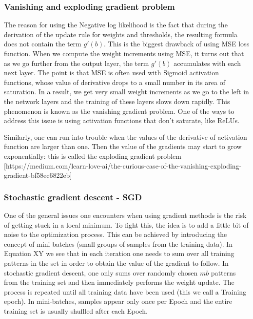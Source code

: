 \subsubsection{Vanishing and exploding gradient problem}

The reason for using the Negative log likelihood is the fact that during the derivation of the update rule for weights and thresholds, the resulting formula does not contain the term $ g'(b) $. This is the biggest drawback of using MSE loss function. When we compute the weight increments using MSE, it turns out that as we go further from the output layer, the term $ g'(b) $ accumulates with each next layer. The point is that MSE is often used with Sigmoid activation functions, whose value of derivative drops to a small number in its area of saturation. In a result, we get very small weight increments as we go to the left in the network layers and the training of these layers slows down rapidly. This phenomenon is known as the vanishing gradient problem. One of the ways to address this issue is using activation functions that don't saturate, like ReLUs.

Similarly, one can run into trouble when the values of the derivative of activation function are larger than one. Then the value of the gradients may start to grow exponentially: this is called the exploding gradient problem [https://medium.com/learn-love-ai/the-curious-case-of-the-vanishing-exploding-gradient-bf58ec6822eb]
\subsubsection{Stochastic gradient descent - SGD}

One of the general issues one encounters when using gradient methods is the risk of getting stuck in a local minimum. To fight this, the idea is to add a little bit of noise to the optimization process. This can be achieved by introducing the concept of mini-batches (small groups of samples from the training data). In Equation XY we see that in each iteration one needs to sum over all training patterns in the set in order to obtain the value of the gradient to follow. In stochastic gradient descent, one only sums over randomly chosen $ mb $ patterns from the training set and then immediately performs the weight update. The process is repeated until all training data have been used (this we call a Training epoch). In mini-batches, samples appear only once per Epoch and the entire training set is usually shuffled after each Epoch.

